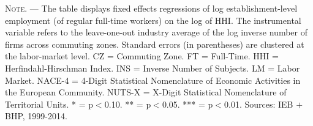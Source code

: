 \documentclass[11pt,oneside,reqno,xcolor=dvipsnames]{article} %
\begin{document}
\begin{appendix}
\begin{refsection}
\begin{landscape}
\begin{table}[!ht]
{\begin{threeparttable}
\begin{tablenotes}
\item \footnotesize \textsc{Note. ---} The table displays fixed effects regressions of log establishment-level employment (of regular full-time workers) on the log of HHI. The instrumental variable refers to the leave-one-out industry average of the log inverse number of firms across commuting zones. Standard errors (in parentheses) are clustered at the labor-market level. CZ = Commuting Zone. FT = Full-Time. HHI = Herfindahl-Hirschman Index. INS = Inverse Number of Subjects. LM = Labor Market. NACE-4 = 4-Digit Statistical Nomenclature of Economic Activities in the European Community. NUTS-X = X-Digit Statistical Nomenclature of Territorial Units. * = p$<$0.10. ** = p$<$0.05. *** = p$<$0.01. Sources: IEB $\plus$ BHP, 1999-2014.
\end{tablenotes}
\end{threeparttable}
}
\end{table}



\vspace*{\fill}
\clearpage
\vspace*{\fill}




\end{landscape}
\end{refsection}
\end{appendix}
\end{document}
